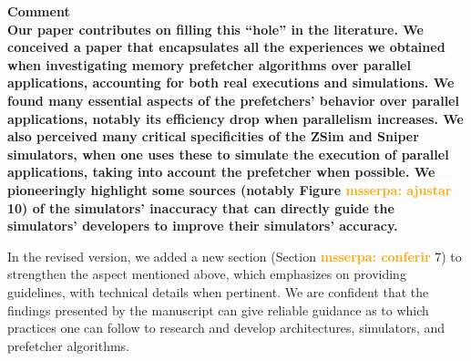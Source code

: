 \documentclass{article}
\newcounter{answer}
\newenvironment{answer}
{ \refstepcounter{answer}\vspace{0.5cm}\bfseries\noindent Comment~\theanswer\\ }
{ \vspace{0.5cm} }
\newcommand{\ms}[1]{\textcolor{orange}{\textbf{ msserpa: #1} }\vspace{0.2cm}}
\newcommand{\vsg}[1]{\textcolor{blue}{\textbf{vsgirelli: #1} }\vspace{0.2cm}}
\begin{document}
\begin{answer}
Our paper contributes on filling this ``hole'' in the literature. We conceived a paper that encapsulates all the experiences we obtained when investigating memory prefetcher algorithms over parallel applications, accounting for both real executions and simulations. 
We found many essential aspects of the prefetchers' behavior over parallel applications, notably its efficiency drop when parallelism increases. We also perceived many critical specificities of the ZSim and Sniper simulators, when one uses these to simulate the execution of parallel applications, taking into account the prefetcher when possible. We pioneeringly highlight some sources (notably Figure \ms{ajustar}10) of the simulators' inaccuracy that can directly guide the simulators' developers to improve their simulators' accuracy.

In the revised version, we added a new section (Section \ms{conferir}7) to strengthen the aspect mentioned above, which emphasizes on providing guidelines, with technical details when pertinent. We are confident that the findings presented by the manuscript can give reliable guidance as to which practices one can follow to research and develop architectures, simulators, and prefetcher algorithms. 







\end{answer}
\end{document}
